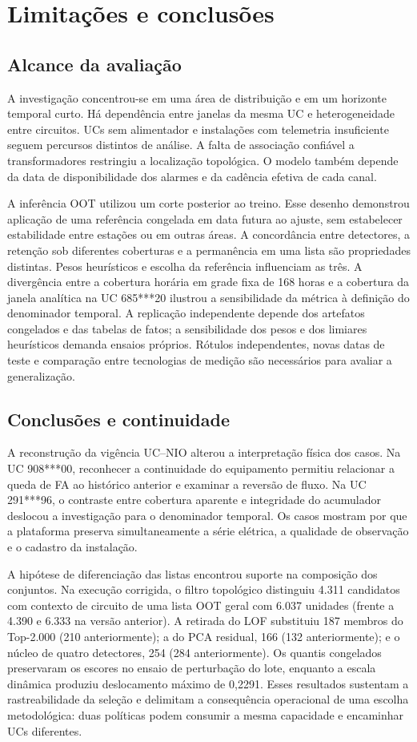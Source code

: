 \chapter{Limitações e conclusões}
\section{Alcance da avaliação}
A investigação concentrou-se em uma área de distribuição e em um horizonte temporal curto. Há dependência entre janelas da mesma UC e heterogeneidade entre circuitos. UCs sem alimentador e instalações com telemetria insuficiente seguem percursos distintos de análise. A falta de associação confiável a transformadores restringiu a localização topológica. O modelo também depende da data de disponibilidade dos alarmes e da cadência efetiva de cada canal.

A inferência OOT utilizou um corte posterior ao treino. Esse desenho demonstrou aplicação de uma referência congelada em data futura ao ajuste, sem estabelecer estabilidade entre estações ou em outras áreas. A concordância entre detectores, a retenção sob diferentes coberturas e a permanência em uma lista são propriedades distintas. Pesos heurísticos e escolha da referência influenciam as três. A divergência entre a cobertura horária em grade fixa de 168 horas e a cobertura da janela analítica na UC 685***20 ilustrou a sensibilidade da métrica à definição do denominador temporal. A replicação independente depende dos artefatos congelados e das tabelas de fatos; a sensibilidade dos pesos e dos limiares heurísticos demanda ensaios próprios. Rótulos independentes, novas datas de teste e comparação entre tecnologias de medição são necessários para avaliar a generalização.

\section{Conclusões e continuidade}
A reconstrução da vigência UC–NIO alterou a interpretação física dos casos. Na UC 908***00, reconhecer a continuidade do equipamento permitiu relacionar a queda de FA ao histórico anterior e examinar a reversão de fluxo. Na UC 291***96, o contraste entre cobertura aparente e integridade do acumulador deslocou a investigação para o denominador temporal. Os casos mostram por que a plataforma preserva simultaneamente a série elétrica, a qualidade de observação e o cadastro da instalação.

A hipótese de diferenciação das listas encontrou suporte na composição dos conjuntos. Na execução corrigida, o filtro topológico distinguiu 4.311 candidatos com contexto de circuito de uma lista OOT geral com 6.037 unidades (frente a 4.390 e 6.333 na versão anterior). A retirada do LOF substituiu 187 membros do Top-2.000 (210 anteriormente); a do PCA residual, 166 (132 anteriormente); e o núcleo de quatro detectores, 254 (284 anteriormente). Os quantis congelados preservaram os escores no ensaio de perturbação do lote, enquanto a escala dinâmica produziu deslocamento máximo de 0,2291. Esses resultados sustentam a rastreabilidade da seleção e delimitam a consequência operacional de uma escolha metodológica: duas políticas podem consumir a mesma capacidade e encaminhar UCs diferentes.

